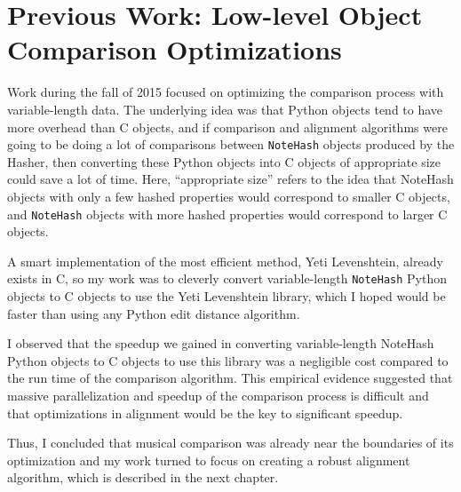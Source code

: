 \section{Previous Work: Low-level Object Comparison Optimizations} \label{spaceoptimizations}
Work during the fall of 2015 focused on optimizing the comparison process with variable-length data. The underlying idea was that Python objects tend to have more overhead than C objects, and if comparison and alignment algorithms were going to be doing a lot of comparisons between \texttt{NoteHash} objects produced by the Hasher, then converting these Python objects into C objects of appropriate size could save a lot of time. Here, ``appropriate size'' refers to the idea that NoteHash objects with only a few hashed properties would correspond to smaller C objects, and \texttt{NoteHash} objects with more hashed properties would correspond to larger C objects. 

A smart implementation of the most efficient method, Yeti Levenshtein, already exists in C, so my work was to cleverly convert variable-length \texttt{NoteHash} Python objects to C objects to use the Yeti Levenshtein library, which I hoped would be faster than using any Python edit distance algorithm.

I observed that the speedup we gained in converting variable-length NoteHash Python objects to C objects to use this library was a negligible cost compared to the run time of the comparison algorithm. This empirical evidence suggested that massive parallelization and speedup of the comparison process is difficult and that optimizations in alignment would be the key to significant speedup.

Thus, I concluded that musical comparison was already near the boundaries of its optimization and my work turned to focus on creating a robust alignment algorithm, which is described in the next chapter.  